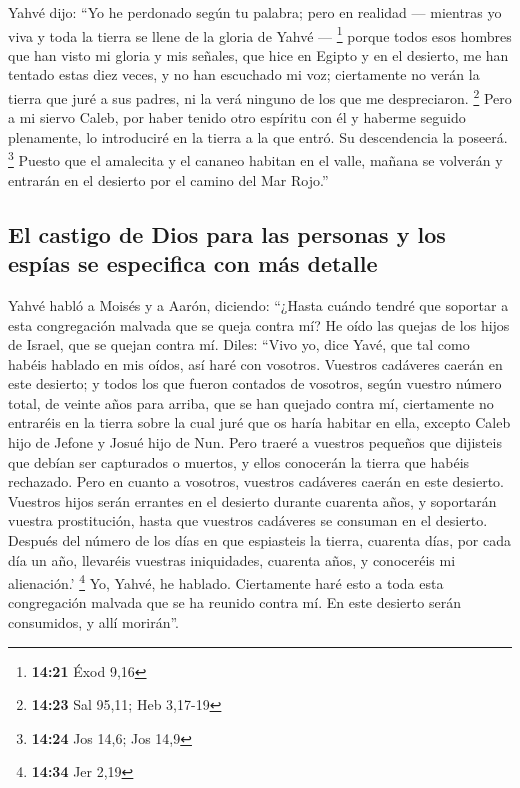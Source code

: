 \begin{paracol}{2}
 Yahvé dijo: ``Yo he perdonado según tu palabra;
 pero en realidad --- mientras yo viva y toda la tierra
se llene de la gloria de Yahvé --- \footnote{\textbf{14:21} Éxod 9,16}
 porque todos esos hombres que han visto mi gloria y mis
señales, que hice en Egipto y en el desierto, me han tentado estas diez
veces, y no han escuchado mi voz;  ciertamente no verán
la tierra que juré a sus padres, ni la verá ninguno de los que me
despreciaron. \footnote{\textbf{14:23} Sal 95,11; Heb 3,17-19}
 Pero a mi siervo Caleb, por haber tenido otro espíritu
con él y haberme seguido plenamente, lo introduciré en la tierra a la
que entró. Su descendencia la poseerá. \footnote{\textbf{14:24} Jos
  14,6; Jos 14,9}  Puesto que el amalecita y el cananeo
habitan en el valle, mañana se volverán y entrarán en el desierto por el
camino del Mar Rojo.''

\hypertarget{el-castigo-de-dios-para-las-personas-y-los-espuxedas-se-especifica-con-muxe1s-detalle}{%
\subsection{El castigo de Dios para las personas y los espías se
especifica con más
detalle}\label{el-castigo-de-dios-para-las-personas-y-los-espuxedas-se-especifica-con-muxe1s-detalle}}

 Yahvé habló a Moisés y a Aarón, diciendo:
 ``¿Hasta cuándo tendré que soportar a esta congregación
malvada que se queja contra mí? He oído las quejas de los hijos de
Israel, que se quejan contra mí.  Diles: ``Vivo yo, dice
Yavé, que tal como habéis hablado en mis oídos, así haré con vosotros.
 Vuestros cadáveres caerán en este desierto; y todos los
que fueron contados de vosotros, según vuestro número total, de veinte
años para arriba, que se han quejado contra mí, 
ciertamente no entraréis en la tierra sobre la cual juré que os haría
habitar en ella, excepto Caleb hijo de Jefone y Josué hijo de Nun.
 Pero traeré a vuestros pequeños que dijisteis que debían
ser capturados o muertos, y ellos conocerán la tierra que habéis
rechazado.  Pero en cuanto a vosotros, vuestros cadáveres
caerán en este desierto.  Vuestros hijos serán errantes
en el desierto durante cuarenta años, y soportarán vuestra prostitución,
hasta que vuestros cadáveres se consuman en el desierto. 
Después del número de los días en que espiasteis la tierra, cuarenta
días, por cada día un año, llevaréis vuestras iniquidades, cuarenta
años, y conoceréis mi alienación.' \footnote{\textbf{14:34} Jer 2,19}
 Yo, Yahvé, he hablado. Ciertamente haré esto a toda esta
congregación malvada que se ha reunido contra mí. En este desierto serán
consumidos, y allí morirán''.


\end{paracol}
